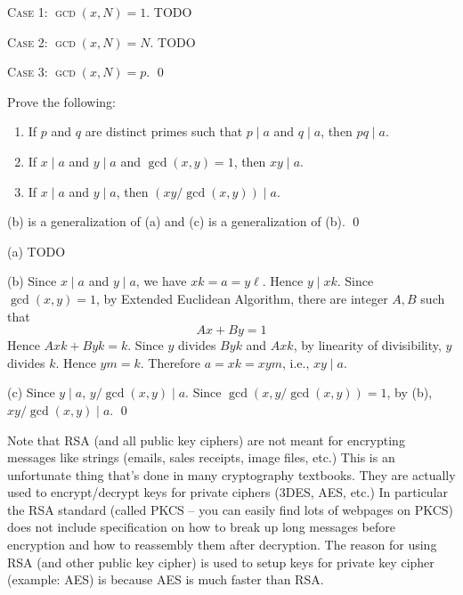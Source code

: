 \textsc{Case 1: $\gcd(x, N) = 1$.}
TODO

\textsc{Case 2: $\gcd(x, N) = N$.}
TODO

\textsc{Case 3: $\gcd(x, N) = p$.}
\qed

\begin{prop}
  Prove the following:
  \begin{enumerate}[nosep,label=\textnormal{(\alph*)}]
  \item
    If $p$ and $q$ are distinct primes such that $p \mid a$ and $q \mid a$,
    then $pq \mid a$.
  \item 
    If $x \mid a$ and $y \mid a$ and $\gcd(x,y) = 1$, then $xy \mid a$.
  \item
    If $x \mid a$ and $y \mid a$, then $(xy/\gcd(x,y)) \mid a$.
  \end{enumerate}
  (b) is a generalization of (a)
  and (c) is a generalization of (b).
  \qed
\end{prop}
\proof
(a) TODO

(b)
Since $x \mid a$ and $y \mid a$, we have
$xk = a = y\ell$.
Hence $y \mid xk$.
Since $\gcd(x,y) = 1$,
by Extended Euclidean Algorithm, there are integer $A, B$ such that
\[
Ax + By = 1
\]
Hence
$Axk + Byk = k$.
Since $y$ divides $Byk$ and $Axk$, by linearity of divisibility,
$y$ divides $k$.
Hence $ym = k$.
Therefore $a = xk = xym$, i.e., $xy \mid a$.

(c)
Since $y \mid a$, $y/\gcd(x,y) \mid a$.
Since $\gcd(x, y/\gcd(x,y)) = 1$, by (b), $xy/\gcd(x,y) \mid a$.
\qed

Note that RSA (and all public key ciphers) are not
meant for encrypting messages like strings (emails, sales receipts,
image files, etc.)
This is an unfortunate thing that's done in many cryptography textbooks. 
They are actually used to encrypt/decrypt keys for private ciphers
(3DES, AES, etc.)
In particular the RSA standard
(called PKCS -- you can easily find lots of webpages on PKCS)
does not include
specification on how to break up long messages before encryption and how to
reassembly them after decryption.
The reason for using RSA (and other public key cipher) is used to
setup keys for private key cipher (example: AES) is because
AES is much faster than RSA.

